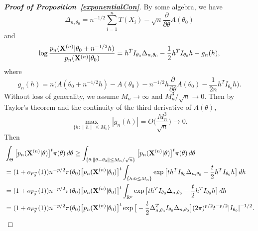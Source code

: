 \documentclass[11pt]{article}
\theoremstyle{plain}
\theoremstyle{definition}
\theoremstyle{remark}
\begin{document}
\begin{appendices}
\begin{proof}[\textbf{Proof of Proposition~\ref{exponentialCon}}]
    By some algebra, we have
    $$
    \Delta_{n,\theta_0}=n^{-1/2}\sum_{i=1}^n T(X_i)-\sqrt{n}\frac{\partial}{\partial \theta} A(\theta_0)
    $$
    and
    $$
    \log\frac{p_n(\mathbf{X}^{(n)}|\theta_0+n^{-1/2}h)}{p_n(\mathbf{X}^{(n)}|\theta_0)}
    =h^T I_{\theta_0} \Delta_{n,\theta_0}-\frac{1}{2} h^T I_{\theta_0} h-
    g_n(h),
    $$
    where
    $$
    g_n(h)=n\Big(A(\theta_0+n^{-1/2}h)-A(\theta_0)-n^{-1/2}h \frac{\partial}{\partial \theta}A(\theta_0)-\frac{1}{2n}h^T I_{\theta_0}h\Big).
    $$
    Without loss of generality, we assume $M_n\to \infty$ and $M_n^3/\sqrt{n}\to 0$.
    Then by Taylor's theorem and the continuity of the third derivative of $A(\theta)$, 
    $$
        \max_{\{h:\|h\|\leq M_n\}}|g_n(h)|=O\Big(\frac{M_n^3}{\sqrt{n}}\Big)\to 0.
    $$
    Then
$$
    \begin{aligned}
        &\int_{\Theta} \big[p_n(\mathbf{X}^{(n)}|\theta)\big]^t \pi(\theta)\, d\theta
        \geq
        \int_{\{\theta:\|\theta-\theta_0\|\leq M_n/\sqrt{n}\}} \big[p_n(\mathbf{X}^{(n)}|\theta)\big]^t \pi(\theta)\, d\theta
        \\
        &=
        (1+o_{P_0^n}(1))n^{-p/2}\pi(\theta_0)\big[p_n(\mathbf{X}^{(n)}|\theta_0)\big]^t\int_{\{h:h\leq M_n\}} \exp\big[ t h^T I_{\theta_0}\Delta_{n,\theta_0}-\frac{t}{2}h^T I_{\theta_0}h\big] \, dh
        \\
        &=
        (1+o_{P_0^n}(1))n^{-p/2}\pi(\theta_0) \big[p_n(\mathbf{X}^{(n)}|\theta_0)\big]^t\int_{\mathbb{R}^p} \exp\big[t h^T I_{\theta_0}\Delta_{n,\theta_0}-\frac{t}{2}h^T I_{\theta_0}h\big] \, dh
        \\
        &=
        (1+o_{P_0^n}(1))n^{-p/2}\pi(\theta_0)\big[p_n(\mathbf{X}^{(n)}|\theta_0)\big]^t
        \exp\big[-\frac{t}{2}\Delta_{n,\theta_0}^T I_{\theta_0}\Delta_{n,\theta_0}\big]
        (2\pi)^{p/2} t^{-p/2}  |I_{\theta_0}|^{-1/2}.
    \end{aligned}
$$


\end{proof}
\end{appendices}
\end{document}
